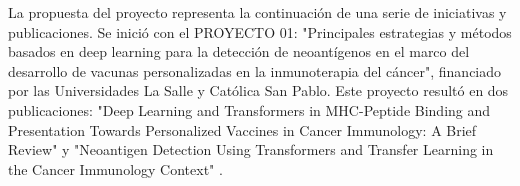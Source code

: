 \documentclass[a4paper,11pt]{article}
\begin{document}
La propuesta del proyecto representa la continuación de una serie de iniciativas y publicaciones. Se inició con el PROYECTO 01: "Principales estrategias y métodos basados en deep learning para la detección de neoantígenos en el marco del desarrollo de vacunas personalizadas en la inmunoterapia del cáncer", financiado por las Universidades La Salle y Católica San Pablo. Este proyecto resultó en dos publicaciones: "Deep Learning and Transformers in MHC-Peptide Binding and Presentation Towards Personalized Vaccines in Cancer Immunology: A Brief Review" \cite{machaca2023deep} y "Neoantigen Detection Using Transformers and Transfer Learning in the Cancer Immunology Context" \cite{arceda2023neoantigen}.

\end{document}
